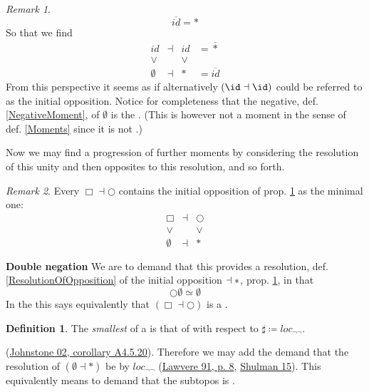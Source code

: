 \documentclass[12pt,titlepage]{article}
\newcommand{\itexarray}[1]{\begin{matrix}#1\end{matrix}}
\theoremstyle{plain}
\theoremstyle{definition}
\newtheorem{defn}{Definition}
\theoremstyle{remark}
\newtheorem{remark}{Remark}
\begin{document}
\begin{remark}
\begin{displaymath}
\overline{id} = \ast
\end{displaymath}
So that we find
\begin{displaymath}
\itexarray{
id &\dashv& id & = \overline{\ast}
\\
\vee && \vee
\\
\emptyset &\dashv& \ast & = \overline{id}
}
\end{displaymath}
From this perspective it seems as if alternatively $(\id \dashv \id)$ could be referred to as the initial opposition.
Notice for completeness that the negative, def. \ref{NegativeMoment}, of $\emptyset$ is the . (This is however not a moment in the sense of def. \ref{Moments} since it is not .)
\end{remark}
Now we may find a progression of further moments by considering the resolution of this unity and then opposites to this resolution, and so forth.
\begin{remark}
\label{}\hypertarget{}{}
Every    $\Box \dashv \bigcirc$ contains the initial opposition of prop. \ref{InitialOpposition} as the minimal one:
\begin{displaymath}
\itexarray{
\Box &\dashv& \bigcirc
\\
\vee && \vee
\\
\emptyset &\dashv& \ast
}
\end{displaymath}
\end{remark}
 \textbf{Double negation}
We are to demand that this provides a resolution, def. \ref{ResolutionOfOpposition} of the initial opposition $\empty \dashv \ast$, prop. \ref{InitialOpposition}, in that
\begin{displaymath}
\bigcirc \emptyset \simeq \emptyset
\end{displaymath}
In the  this says equivalently that $(\Box \dashv \bigcirc)$ is a .
\begin{defn}
\label{InitialOpposition}\hypertarget{InitialOpposition}{}
The \emph{smallest}  of a  is that of  with respect to  $\sharp \coloneqq loc_{\neg \neg}$.
\end{defn}
(\hyperlink{Johnstone02}{Johnstone 02, corollary A4.5.20}).
Therefore we may add the demand that the resolution of $(\emptyset \dashv \ast)$ be by $loc_{\neg \neg}$ (\hyperlink{Lawvere91}{Lawvere 91, p. 8}, \href{}{Shulman 15}). This equivalently means to demand that the  subtopos is  .
\end{document}
